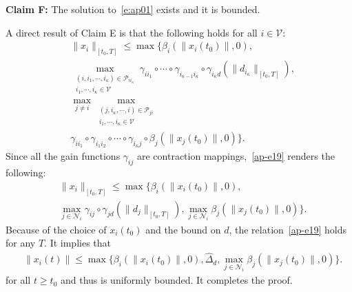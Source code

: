 \documentclass[journal]{IEEEtran}
\newcommand{\nnum}{\nonumber}
\newcommand{\NN}{{\mathcal{N}}}
\newcommand{\VV}{{\mathcal{V}}}
\begin{document}
\begin{IEEEproof}
\textbf{Claim F:} The solution to~\eqref{e:ap01} exists and it is bounded.
\begin{IEEEproof} A direct result of Claim E is that the following holds for all $i\in {\VV}$:
\begin{align}&\|x_i\|_{[t_0,T]}\leq \max\{\beta_i(\|x_i(t_0)\|,0),\nnum\\
&\max_{\substack{(i,i_1,\cdots,i_\kappa)\in\mathcal{P}_{i i_\kappa}\\
i_1,\cdots,i_\kappa\in {\VV}}}\gamma_{ii_1}\circ\cdots
\circ\gamma_{i_{\kappa-1}i_{\kappa}}\circ\gamma_{i_{\kappa}d}
(\|d_{i_{\kappa}}\|_{[t_0,T]}),\nnum\\
&\max_{j\neq i}\max_{\substack{(j,i_\kappa,\cdots,i)\in\mathcal{P}_{ji}\\
i_1,\cdots,i_{\kappa}\in {\VV}}}\nnum\\
&\gamma_{ii_1}\circ\gamma_{i_1i_2}\circ\cdots\circ\gamma_{i_\kappa j}\circ
\beta_j(\|x_j(t_0)\|,0)\}.\label{ap-e19}\end{align}
Since all the gain functions $\gamma_{ij}$ are contraction mappings,~\eqref{ap-e19} renders the following:
\begin{align}
&\|x_i\|_{[t_0,T]}\leq \max\{\beta_i(\|x_i(t_0)\|,0),\nnum\\
&\max_{j\in{{\NN}}_i}\gamma_{ij}\circ\gamma_{jd}(\|d_j\|_{[t_0,T]}),\max_{j\in {{\NN}}_i}\beta_j(\|x_j(t_0)\|,0)\}.\label{ap-e20}\end{align}
Because of the choice of $x_i(t_0)$ and the bound on $d$, the relation~\eqref{ap-e19} holds for any $T$. It implies that
\begin{align*}
&\|x_i(t)\|\leq \max\{\beta_i(\|x_i(t_0)\|,0),\hat{\Delta}_d,\max_{j\in {{\NN}}_i}\beta_j(\|x_j(t_0)\|,0)\}.
\end{align*}
for all $t\geq t_0$ and thus is uniformly bounded. It completes the proof.
\end{IEEEproof}


\end{IEEEproof}
\end{document}

